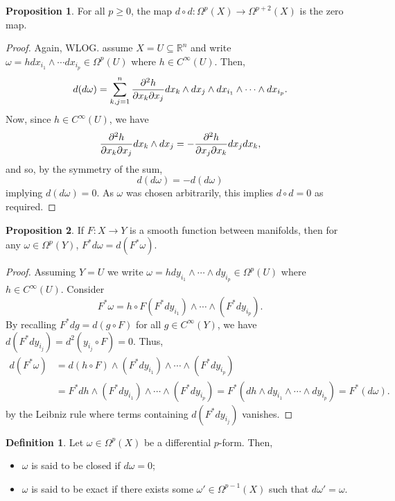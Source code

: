 \documentclass[]{article}
\theoremstyle{definition}
\theoremstyle{definition}
\newtheorem{definition}{Definition}[section]
\newtheorem{proposition}{Proposition}[section]
\begin{document}
\begin{proposition}
  For all \(p \ge 0\), the map \(d \circ d : \Omega^p(X) \to \Omega^{p + 2}(X)\)
  is the zero map.
\end{proposition}
\begin{proof}
  Again, WLOG. assume \(X = U \subseteq \mathbb{R}^n\) and write 
  \(\omega = h dx_{i_1} \wedge \cdots dx_{i_p} \in \Omega^p(U)\) where 
  \(h \in C^\infty(U)\). Then, 
  \[d(d\omega) = \sum_{k, j = 1}^n \pdv{h}{x_k}{x_j} dx_k \wedge dx_j \wedge 
    dx_{i_1} \wedge \cdots \wedge dx_{i_p}.\]
  Now, since \(h \in C^\infty(U)\), we have 
  \[\pdv{h}{x_k}{x_j}dx_k \wedge dx_j = - \pdv{h}{x_j}{x_k} dx_j dx_k,\]
  and so, by the symmetry of the sum, 
  \[d(d\omega) = - d(d\omega)\]
  implying \(d(d\omega) = 0\). As \(\omega\) was chosen arbitrarily, this implies 
  \(d \circ d = 0\) as required.
\end{proof}

\begin{proposition}
  If \(F : X \to Y\) is a smooth function between manifolds, then for any 
  \(\omega \in \Omega^p(Y)\), \(F^* d\omega = d(F^*\omega)\).
\end{proposition}
\begin{proof}
  Assuming \(Y = U\) we write \(\omega = h dy_{i_1} \wedge \cdots 
  \wedge dy_{i_p} \in \Omega^p(U)\) 
  where \(h \in C^\infty(U)\). Consider 
  \[F^* \omega = h \circ F (F^* dy_{i_1}) \wedge \cdots \wedge (F^* dy_{i_p}).\]
  By recalling \(F^* dg = d(g \circ F)\) for all \(g \in C^\infty(Y)\), we have
  \(d(F^*dy_{i_j}) = d^2(y_{i_j} \circ F) = 0\). Thus, 
  \[\begin{split}
    d(F^* \omega) & = d(h \circ F) \wedge (F^* dy_{i_1}) \wedge \cdots 
    \wedge (F^* dy_{i_p})\\
    & = F^* dh \wedge (F^* dy_{i_1}) \wedge \cdots \wedge (F^* dy_{i_p}) 
      = F^* (dh \wedge dy_{i_1} \wedge \cdots \wedge dy_{i_p}) = F^*(d\omega).
  \end{split}\]
  by the Leibniz rule where terms containing \(d(F^* dy_{i_j})\) vanishes.
\end{proof}

\begin{definition}
  Let \(\omega \in \Omega^p(X)\) be a differential \(p\)-form. Then,
  \begin{itemize}
    \item \(\omega\) is said to be closed if \(d\omega = 0\);
    \item \(\omega\) is said to be exact if there exists some 
      \(\omega' \in \Omega^{p - 1}(X)\) such that \(d\omega' = \omega\).
  \end{itemize}
\end{definition}
\end{document}

